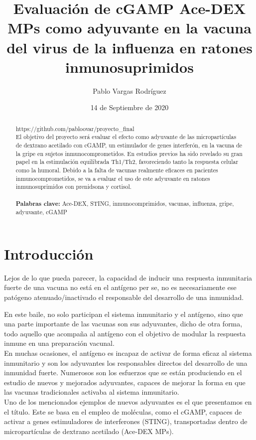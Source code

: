 \documentclass[a4paper,11pt]{article}
\providecommand{\keywords}[1]{\textbf{Palabras clave:} #1}
\begin{document}
	\title{Evaluación de cGAMP Ace-DEX MPs como adyuvante en la vacuna del virus de la influenza en ratones inmunosuprimidos}
	\author{Pablo Vargas Rodríguez}
	\date{14 de Septiembre de 2020}
	\maketitle
	\begin{abstract}
https://github.com/pabloovar/proyecto\_final \\
El objetivo del proyecto será evaluar el efecto como adyuvante de las micropartículas de dextrano acetilado con cGAMP, un estimulador de genes interferón, en la vacuna de la gripe en sujetos inmunocomprometidos. En estudios previos ha sido revelado su gran papel en la estimulación equilibrada Th1/Th2, favoreciendo tanto la respuesta celular como la humoral. Debido a la falta de vacunas realmente eficaces en pacientes inmunocomprometidos, se va a evaluar el uso de este adyuvante en ratones inmunosuprimidos con prenidsona y cortisol.
\\ \\
\keywords{Ace-DEX, STING, inmunocomprimidos, vacunas, influenza, gripe, adyuvante, cGAMP}
	\end{abstract}

\section{Introducción}
Lejos de lo que pueda parecer, la capacidad de inducir una respuesta inmunitaria fuerte de una vacuna no está en el antígeno per se, no es necesariamente ese patógeno atenuado/inactivado el responsable del desarrollo de una inmunidad. 

En este baile, no solo participan el sistema inmunitario y el antígeno, sino que una parte importante de las vacunas son sus adyuvantes, dicho de otra forma, todo aquello que acompaña al antígeno con el objetivo de modular la respuesta inmune en una preparación vacunal.
\\En muchas ocasiones, el antígeno es incapaz de activar de forma eficaz al sistema inmunitario y son los adyuvantes los responsables directos del desarrollo de una inmunidad fuerte.
Numerosos son los esfuerzos que se están produciendo en el estudio de nuevos y mejorados adyuvantes, capaces de mejorar la forma en que las vacunas tradicionales activaba al sistema inmunitario.
\\Uno de los mencionados ejemplos de nuevos adyuvantes es el que presentamos en el título. Este se basa en el empleo de moléculas, como el cGAMP, capaces de activar a genes estimuladores de interferones (STING), transportadas dentro de micropartículas de dextrano acetilado (Ace-DEX MPs). \cite{ady}
\\
\end{document}
